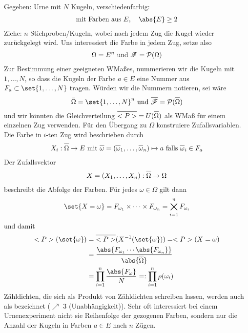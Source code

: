 Gegeben: Urne mit $N$ Kugeln, verschiedenfarbig:
\begin{align}
	\text{mit Farben aus } E, \quad \abs{E} \ge 2\notag
\end{align}
Ziehe: $n$ Stichproben/Kugeln, wobei nach jedem Zug die Kugel wieder zurückgelegt wird. Uns interessiert die Farbe in jedem Zug, setze also
\begin{align}
	\Omega = E^n \text{ und } \mathscr{F} = \mathcal{P}(\Omega) \notag
\end{align}
Zur Bestimmung einer geeigneten WMaßes, nummerieren wir die Kugeln mit $1,\dots, N$, so dass die Kugeln der Farbe $a \in E$ eine Nummer aus $F_{a} \subset \set{1,\dots, N}$ tragen. Würden wir die Nummern notieren, sei wäre
\begin{align}
	\overline{\Omega} = \set{1,\dots, N}^n \und \overline{\sigF} = \pows(\overline{\Omega})\notag
\end{align}
und wir könnten die Gleichverteilung $\overline{\probp} = U(\overline{\Omega})$ als WMaß für einem einzelnen Zug verwenden. Für den Übergang zu $\Omega$ konstruiere Zufallsvariablen. Die Farbe in $i$-ten Zug wird beschrieben durch
\begin{align}
	X_i: \overline{\Omega} \to E \mit \overline{\omega} = (\overline{\omega}_1, \dots, \overline{\omega}_n) \mapsto a \text{ falls } \overline{\omega}_i \in F_a\notag
\end{align}
Der Zufallsvektor
\begin{align}
	X = (X_1, \dots, X_n): \overline{\Omega} \to \Omega\notag
\end{align}
beschreibt die Abfolge der Farben. Für jedes $\omega \in \Omega$ gilt dann
\begin{align}
	\set{X = \omega} = F_{\omega_1} \times \cdots \times F_{\omega_n} = \bigtimes_{i=1}^{n} F_{\omega_i}\notag
\end{align}
und damit
\begin{align}
	\probp(\set{\omega}) 
	&= \overline{\probp}(X^{-1}(\set{\omega})) = \probp(X=\omega)\notag\\
	&= \frac{\abs{F_{\omega_1} \cdots \abs{F_{\omega_n}}}}{\abs{\overline{\Omega}}}\notag\\
	&= \prod_{i=1}^{n} \frac{\abs{F_{\omega}}}{N} =: \prod_{i=1}^{n} \rho(\omega_i)\notag
\end{align}
Zähldichten, die sich als Produkt von Zähldichten schreiben lassen, werden auch als  bezeichnet ($\nearrow$  3 (Unabhängigkeit)). %
Sehr oft interessiert bei einem Urnenexperiment nicht sie Reihenfolge der gezogenen Farben, sondern nur die Anzahl der Kugeln in Farben $a \in E$ nach $n$ Zügen.
